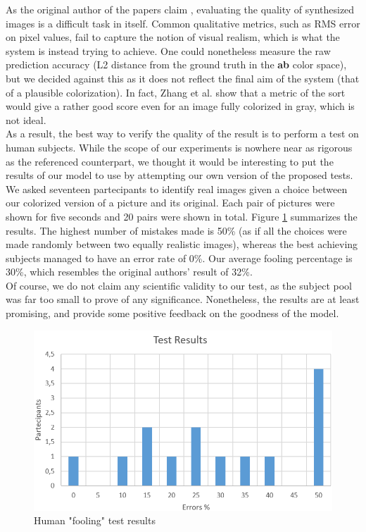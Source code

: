 \documentclass[twoside,twocolumn]{article}
\begin{document}
As the original author of the papers claim \cite{Zhang:2016}, evaluating the quality of synthesized images is a difficult task in itself. Common qualitative metrics, such as RMS error on pixel values, fail to capture the notion of visual realism, which is what the system is instead trying to achieve.
One could nonetheless measure the raw prediction accuracy (L2 distance from the ground truth in the \textbf{ab} color space), but we decided against this as it does not reflect the final aim of the system (that of a plausible colorization). In fact, Zhang et al. \cite{Zhang:2016} show that a metric of the sort would give a rather good score even for an image fully colorized in gray, which is not ideal.\\
As a result, the best way to verify the quality of the result is to perform a test on human subjects. While the scope of our experiments is nowhere near as rigorous as the referenced counterpart, we thought it would be interesting to put the results of our model to use by attempting our own version of the proposed tests.\\
We asked seventeen partecipants to identify real images given a choice between our colorized version of a picture and its original. Each pair of pictures were shown for five seconds and 20 pairs were shown in total.
Figure \ref{fig:testres} summarizes the results. The highest number of mistakes made is 50\% (as if all the choices were made randomly between two equally realistic images), whereas the best achieving subjects managed to have an error rate of 0\%. Our average fooling percentage is 30\%, which resembles the original authors' result of 32\%.\\
Of course, we do not claim any scientific validity to our test, as the subject pool was far too small to prove of any significance. Nonetheless, the results are at least promising, and provide some positive feedback on the goodness of the model.

\begin{figure}
	\includegraphics[width=\linewidth]{img/graficotest.png}
	\caption{Human "fooling" test results}
	\label{fig:testres}
\end{figure}
\end{document}
